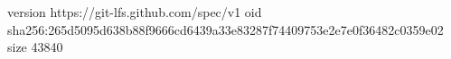 version https://git-lfs.github.com/spec/v1
oid sha256:265d5095d638b88f9666cd6439a33e83287f74409753e2e7e0f36482c0359e02
size 43840
